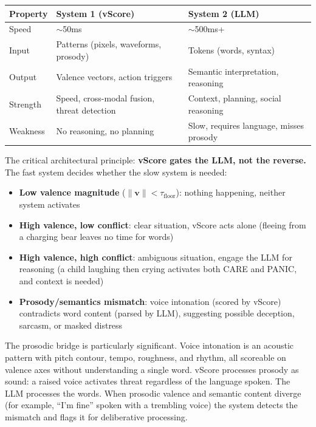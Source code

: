 \documentclass[11pt]{article}
\begin{document}
\begin{table}[h]
\centering
\small
\begin{tabular}{lll}
\toprule
\textbf{Property} & \textbf{System 1 (vScore)} & \textbf{System 2 (LLM)} \\
\midrule
Speed & $\sim$50ms & $\sim$500ms+ \\
Input & Patterns (pixels, waveforms, prosody) & Tokens (words, syntax) \\
Output & Valence vectors, action triggers & Semantic interpretation, reasoning \\
Strength & Speed, cross-modal fusion, threat detection & Context, planning, social reasoning \\
Weakness & No reasoning, no planning & Slow, requires language, misses prosody \\
\bottomrule
\end{tabular}
\end{table}

The critical architectural principle: \textbf{vScore gates the LLM, not the reverse.} The fast system decides whether the slow system is needed:

\begin{itemize}
    \item \textbf{Low valence magnitude} ($\|\mathbf{v}\| < \tau_{\text{floor}}$): nothing happening, neither system activates
    \item \textbf{High valence, low conflict}: clear situation, vScore acts alone (fleeing from a charging bear leaves no time for words)
    \item \textbf{High valence, high conflict}: ambiguous situation, engage the LLM for reasoning (a child laughing then crying activates both CARE and PANIC, and context is needed)
    \item \textbf{Prosody/semantics mismatch}: voice intonation (scored by vScore) contradicts word content (parsed by LLM), suggesting possible deception, sarcasm, or masked distress
\end{itemize}

The prosodic bridge is particularly significant. Voice intonation is an acoustic pattern with pitch contour, tempo, roughness, and rhythm, all scoreable on valence axes without understanding a single word. vScore processes prosody as sound: a raised voice activates threat regardless of the language spoken. The LLM processes the words. When prosodic valence and semantic content diverge (for example, ``I'm fine'' spoken with a trembling voice) the system detects the mismatch and flags it for deliberative processing.
\end{document}

